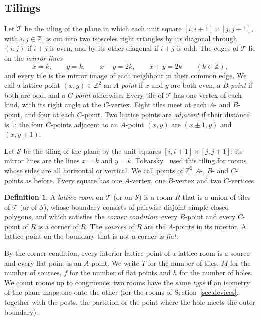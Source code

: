 \documentclass[11pt,a4paper]{article}
\theoremstyle{plain}
\theoremstyle{definition}
\newtheorem{definition}[theorem]{Definition}
\theoremstyle{remark}
\newcommand{\Z}{\mathbb{Z}}
\newcommand{\T}{\mathcal{T}}
\newcommand{\Sq}{\mathcal{S}}
\numberwithin{equation}{section}
\begin{document}
\subsection{Tilings}
Let $\T$ be the tiling of the plane in which each unit square $[i,i+1]\times[j,j+1]$, with $i,j\in\Z$, is cut into two isosceles right triangles by its diagonal through $(i,j)$ if $i+j$ is even, and by its other diagonal if $i+j$ is odd. The edges of $\T$ lie on the \emph{mirror lines}
\begin{equation}\label{eq:mirrors}
x=k,\qquad y=k,\qquad x-y=2k,\qquad x+y=2k\qquad(k\in\Z),
\end{equation}
and every tile is the mirror image of each neighbour in their common edge. We call a lattice point $(x,y)\in\Z^2$ an \emph{$A$-point} if $x$ and $y$ are both even, a \emph{$B$-point} if both are odd, and a \emph{$C$-point} otherwise. Every tile of $\T$ has one vertex of each kind, with its right angle at the $C$-vertex. Eight tiles meet at each $A$- and $B$-point, and four at each $C$-point. Two lattice points are \emph{adjacent} if their distance is $1$; the four $C$-points adjacent to an $A$-point $(x,y)$ are $(x\pm1,y)$ and $(x,y\pm1)$.

Let $\Sq$ be the tiling of the plane by the unit squares $[i,i+1]\times[j,j+1]$; its mirror lines are the lines $x=k$ and $y=k$. Tokarsky~\cite[Example~4]{Tok95} used this tiling for rooms whose sides are all horizontal or vertical. We call points of $\Z^2$ $A$-, $B$- and $C$-points as before. Every square has one $A$-vertex, one $B$-vertex and two $C$-vertices.

\begin{definition}\label{def:latticeroom}
A \emph{lattice room} on $\T$ (or on $\Sq$) is a room $R$ that is a union of tiles of $\T$ (or of $\Sq$), whose boundary consists of pairwise disjoint simple closed polygons, and which satisfies the \emph{corner condition}: every $B$-point and every $C$-point of $R$ is a corner of $R$. The \emph{sources} of $R$ are the $A$-points in its interior. A lattice point on the boundary that is not a corner is \emph{flat}.
\end{definition}

By the corner condition, every interior lattice point of a lattice room is a source and every flat point is an $A$-point. We write $T$ for the number of tiles, $M$ for the number of sources, $f$ for the number of flat points and $h$ for the number of holes. We count rooms up to congruence: two rooms have the same \emph{type} if an isometry of the plane maps one onto the other (for the rooms of Section~\ref{sec:devices}, together with the posts, the partition or the point where the hole meets the outer boundary).
\end{document}
